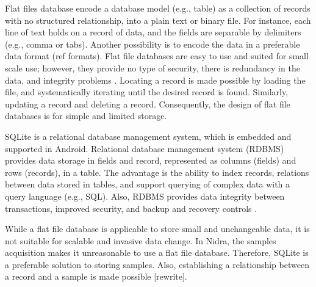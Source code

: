 Flat files database encode a database model (e.g., table) as a collection of records with no structured relationship, into a plain text or binary file. For instance, each line of text holds on a record of data, and the fields are separable by delimiters (e.g., comma or tabs). Another possibility is to encode the data in a preferable data format (ref formats). Flat file databases are easy to use and suited for small scale use; however, they provide no type of security, there is redundancy in the data, and integrity problems \cite{flatfilerdbms}. Locating a record is made possible by loading the file, and systematically iterating until the desired record is found. Similarly, updating a record and deleting a record. Consequently, the design of flat file databases is for simple and limited storage.

SQLite is a relational database management system, which is embedded and supported in Android. Relational database management system (RDBMS) provides data storage in fields and record, represented as columns (fields) and rows (records), in a table. The advantage is the ability to index records, relations between data stored in tables, and support querying of complex data with a query language (e.g., SQL). Also, RDBMS provides data integrity between transactions, improved security, and backup and recovery controls \cite{flatfilerdbms}. 

While a flat file database is applicable to store small and unchangeable data, it is not suitable for scalable and invasive data change. In Nidra, the samples acquisition makes it unreasonable to use a flat file database. Therefore, SQLite is a preferable solution to storing samples. Also, establishing a relationship between a record and a sample is made possible [rewrite]. 

